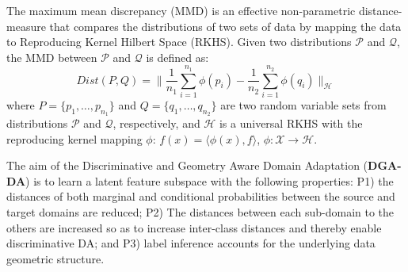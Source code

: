 \documentclass[journal,twocolumn]{IEEEtran}
\newcommand\luo[1]{{\footnotesize \color{blue}[#1 - \textbf{Luo}]}}
\begin{document}
\begin{CJK*}{UTF8}{gkai}
	
	
	The  maximum mean discrepancy (MMD)  is an effective non-parametric distance-measure  that compares the distributions of two sets of data by mapping the data to Reproducing Kernel Hilbert Space\cite{borgwardt2006integrating} (RKHS). Given two distributions $\mathcal{P}$ and $\mathcal{Q}$, the MMD between $\mathcal{P}$ and $\mathcal{Q}$ is defined as:
	\begin{equation}
		\label{eq:MMD}
		Dist(P,Q) = \parallel \frac{1}{n_1} \sum^{n_1}_{i=1} \phi(p_i) - \frac{1}{n_2} \sum^{n_2}_{i=1} \phi(q_i) \parallel_{\mathcal{H}}
	\end{equation}
	where $P=\{ p_1, \ldots, p_{n_1} \}$ and $Q = \{ q_1, \ldots, q_{n_2} \}$ are two random variable sets from distributions $\mathcal{P}$ and $\mathcal{Q}$, respectively, and $\mathcal{H}$ is a universal RKHS with the reproducing kernel mapping $\phi$: $f(x) = \langle \phi(x), f \rangle$, $\phi: \mathcal{X} \to \mathcal{H}$.


The aim of the Discriminative and Geometry Aware Domain Adaptation (\textbf{DGA-DA}) is to learn a latent feature subspace with the following properties: P1) the distances of both marginal and conditional probabilities between the source and target domains are reduced; P2)  The distances between each sub-domain to the others are increased so as to  increase inter-class distances and thereby enable discriminative DA; and P3) label inference accounts for the underlying data geometric structure.






% 
% 


\end{CJK*}
\end{document}

